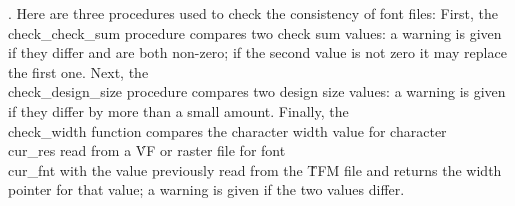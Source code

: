 . Here are three procedures used to check the consistency of font files:
First, the \\{check\_check\_sum} procedure compares two check sum values: a
warning is given if they differ and are both non-zero; if the second
value is not zero it may replace the first one.
Next, the \\{check\_design\_size} procedure compares two design size
values: a warning is given if they differ by more than a small amount.
Finally, the \\{check\_width} function compares the character width value
for character \\{cur\_res} read from a \.{VF} or raster file for font
\\{cur\_fnt} with the value previously read from the \.{TFM} file and
returns the width pointer for that value; a warning is given if the two
values differ.

